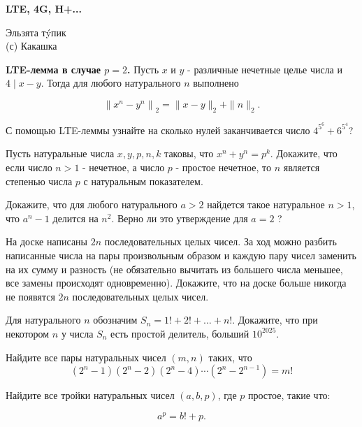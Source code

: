 \centerline{\bf \Huge LTE, 4G, H+...}

\begin{flushright}
        \scriptsize{Эльзята тýпик\\(с) Какашка}
\end{flushright}

\textbf{LTE-лемма в случае $p=2$.}
Пусть $x$ и $y$ - различные нечетные целье числа и $4 \mid x-y$. Тогда для любого натурального $n$ выполнено

$$
\left\|x^n-y^n\right\|_2=\|x-y\|_2+\|n\|_2 .
$$

С помощью LTE-леммы узнайте на сколько нулей заканчивается число $4^{5^6}+6^{5^4}$?

Пусть натуральные числа $x, y, p, n, k$ таковы, что $x^n+y^n=p^k$. Докажите, что если число $n>1$ - нечетное, а число $p$ - простое нечетное, то $n$ является степенью числа $p$ с натуральным показателем.

Докажите, что для любого натурального $a>2$ найдется такое натуральное $n>1$, что $a^n-1$ делится на $n^2$. Верно ли это утверждение для $a=2$ ?

На доске написаны $2 n$ последовательных целых чисел. За ход можно разбить написанные числа на пары произвольным образом и каждую пару чисел заменить на их сумму и разность (не обязательно вычитать из большего числа меньшее, все замены происходят одновременно). Докажите, что на доске больше никогда не появятся $2 n$ последовательных целых чисел.

Для натурального $n$ обозначим $S_n=1!+2!+\ldots+n!$. Докажите, что при некотором $n$ у числа $S_n$ есть простой делитель, больший $10^{2025}$.

Найдите все пары натуральных чисел $(m,n)$ таких, что 
$$
    \left(2^n-1\right)\left(2^n-2\right)\left(2^n-4\right) \cdots\left(2^n-2^{n-1}\right)=m!
$$

Найдите все тройки натуральных чисел $(a, b, p)$, где $p$ простое, такие что:

$$
    a^p=b!+p .
$$
